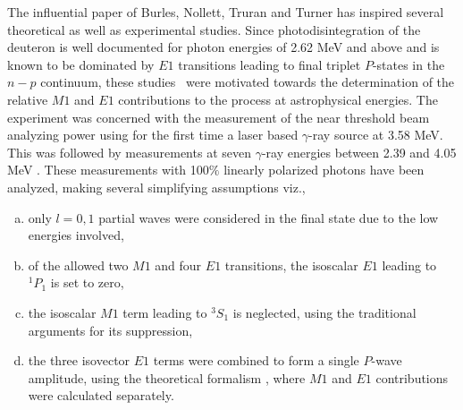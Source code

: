 The influential paper of Burles, Nollett, Truran and Turner \cite{chap34-key17} has inspired several theoretical \cite{chap34-key42,chap34-key43} as well as experimental \cite{chap34-key45,chap34-key46,chap34-key47,chap34-key48} studies. Since photodisintegration of the deuteron is well documented \cite{chap34-key28} for photon energies of 2.62 MeV and above and is known to be dominated by $E1$ transitions leading to final triplet  $P$-states in the $n-p$ continuum, these studies~\cite{chap34-key42,chap34-key43,chap34-key44,chap34-key45,chap34-key46} were  motivated towards the determination of the relative $M1$ and $E1$ contributions to the process at astrophysical energies. The experiment \cite{chap34-key45} was concerned with the measurement of the near threshold beam analyzing power using for the first time a laser based $\gamma$-ray source at 3.58 MeV. This was followed by measurements at seven $\gamma$-ray energies between 2.39 and 4.05 MeV \cite{chap34-key46}. These measurements with 100$\%$ linearly polarized photons have been analyzed, making several  simplifying assumptions viz., 
\begin{enumerate}[a)]
\item only $l=0,1$ partial waves were considered in the final state  due to the low energies involved,
\item of the allowed two $M1$ and four $E1$ transitions, the isoscalar $E1$ leading to $^1P_1$ is set to zero,
\item the isoscalar $M1$ term leading to $^3S_1$ is neglected, using the traditional arguments for its suppression,
\item the three isovector $E1$ terms were combined to form a single $P$-wave amplitude, using the theoretical formalism \cite{chap34-key49}, where $M1$ and $E1$ contributions were calculated separately.
\end{enumerate}

